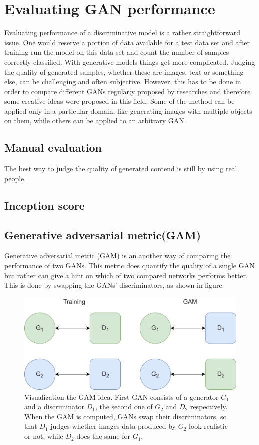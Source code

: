 \section{Evaluating GAN performance}
Evaluating performance of a discriminative model is a rather straightforward issue. One would reserve a portion of data available for a test data set and after training run the model on this data set and count the number of samples correctly classified. With generative models things get more complicated. Judging the quality of generated samples, whether these are images, text or something else, can be challenging and often subjective. However, this has to be done in order to compare different GANs regular;y proposed by researches and therefore some creative ideas were proposed in this field. Some of the method can be applied only in a particular domain, like generating images with multiple objects on them, while others can be applied to an arbitrary GAN. 
\subsection{Manual evaluation}
The best way to judge the quality of generated contend is still by using real people. 
\subsection{Inception score}

\subsection{Generative adversarial metric(GAM)}
Generative adversarial metric (GAM) is an another way of comparing the performance of two GANs. This metric does quantify the quality of a single GAN but rather can give a hint on which of two compared networks performs better. This is done by swapping the GANs' discriminators, as shown in figure 
\begin{figure}[h]
	\includegraphics[width=\textwidth]{figures/gam}
	\caption{Visualization the GAM idea. First GAN consists of a generator $G_1$ and a discriminator $D_1$, the second one of $G_2$ and $D_2$ respectively. When the GAM is computed, GANs swap their discriminators, so that $D_1$ judges whether images data produced by $G_2$ look realistic or not, while $D_2$ does the same for $G_1$.}
	\label{fig:gam}
\end{figure}
 

